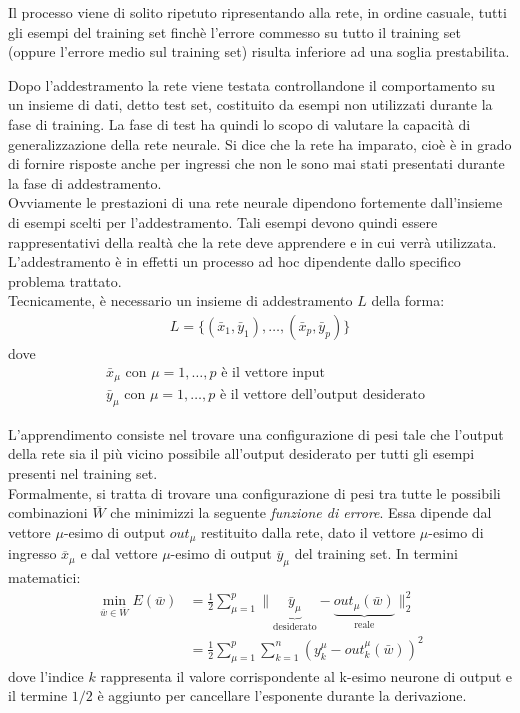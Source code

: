 Il processo viene di solito ripetuto ripresentando alla rete, in ordine casuale, tutti gli esempi del training set finchè l’errore commesso su tutto il training set (oppure l’errore medio sul training set) risulta inferiore ad una soglia prestabilita.

\newpage

Dopo l’addestramento la rete viene testata controllandone il comportamento su un insieme di dati, detto test set, costituito da esempi non utilizzati durante la fase di training. La fase di test ha quindi lo scopo di valutare la capacità di generalizzazione della rete neurale. Si dice che la rete ha imparato, cioè è in grado di fornire risposte anche per ingressi che non le sono mai stati presentati durante la fase di addestramento.\\

Ovviamente le prestazioni di una rete neurale dipendono fortemente dall’insieme di esempi scelti per l’addestramento. Tali esempi devono quindi essere rappresentativi della realtà che la rete deve apprendere e in cui verrà utilizzata. L’addestramento è in effetti un processo ad hoc dipendente dallo specifico problema trattato.\\

Tecnicamente, è necessario un insieme di addestramento $L$ della forma: 
\begin{align}
    L = \{(\bar{x}_1, \bar{y}_1), \dots, (\bar{x}_p, \bar{y}_p) \}
\end{align}
dove
\begin{align*}
    &\bar{x}_\mu \mbox{ con $\mu=1, \dots, p$ è il vettore input} \\
    &\bar{y}_\mu \mbox{ con $\mu=1, \dots, p$ è il vettore dell'output desiderato}
\end{align*}

L'apprendimento consiste nel trovare una configurazione di pesi tale che l'output della rete sia il più vicino possibile all'output desiderato per tutti gli esempi presenti nel training set.\\

Formalmente, si tratta di trovare una configurazione di pesi tra tutte le possibili combinazioni $\overline{W}$ che minimizzi la seguente \emph{funzione di errore}. Essa dipende dal vettore $\mu$-esimo di output $out_\mu$ restituito dalla rete, dato il vettore $\mu$-esimo di ingresso $\overline{x}_\mu$ e dal vettore $\mu$-esimo di output $\overline{y}_\mu$ del training set. In termini matematici:
\begin{align*}
    \min_{\bar{w} \in \overline{W}} E(\bar{w}) &= \frac{1}{2} \sum_{\mu=1}^p \| \underbrace{\bar{y}_\mu}_\textrm{desiderato} - \underbrace{out_\mu (\bar{w})}_\textrm{reale} \|_2^2 \\
    &= \frac{1}{2} \sum_{\mu=1}^p \sum_{k=1}^n \left(y_k^\mu - out_k^\mu (\bar{w})\right)^2
\end{align*}
dove l'indice $k$ rappresenta il valore corrispondente al k-esimo neurone di output e il termine $1/2$ è aggiunto per cancellare l'esponente durante la derivazione.

